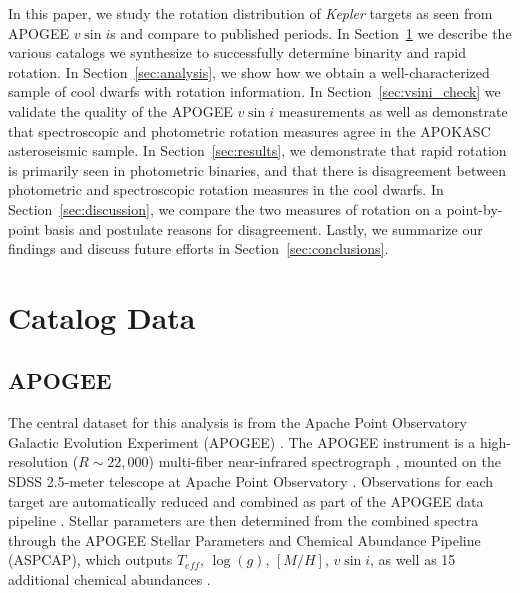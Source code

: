 \documentclass[manuscript]{aastex6}
\newcommand{\vsini}{\ensuremath{v \sin i}}
\newcommand{\Kepler}{\mbox{\textit{Kepler}}}
\newcommand{\Teff}{\ensuremath{T_{eff}}}
\newcommand{\logg}{\ensuremath{\log(g)}}
\begin{document}
In this paper, we study the rotation distribution of \Kepler{} targets as
seen from APOGEE \vsini{}s and compare to published periods. In 
Section~\ref{sec:data} we describe the various catalogs we synthesize to
successfully determine binarity and rapid rotation.
In Section~\ref{sec:analysis}, we show how we obtain a well-characterized
sample of cool dwarfs with rotation information. In
Section~\ref{sec:vsini_check} we validate the quality of the APOGEE \vsini{}
measurements as well as demonstrate that spectroscopic and photometric rotation
measures agree in the 
APOKASC asteroseismic sample. In Section~\ref{sec:results}, we demonstrate that
rapid rotation is primarily seen in photometric binaries, and that there is
disagreement between photometric and spectroscopic rotation measures in the
cool dwarfs. In Section~\ref{sec:discussion}, we compare the two measures of 
rotation on a point-by-point basis and postulate reasons for disagreement. 
Lastly, we summarize our findings and discuss future efforts in 
Section~\ref{sec:conclusions}.

\section{Catalog Data}
\label{sec:data}

\subsection{APOGEE}

The central dataset for this analysis is from the Apache Point Observatory 
Galactic Evolution Experiment (APOGEE) \citep{Blanton17,Majewski17}. The
APOGEE instrument is a high-resolution (\(R \sim 22,000\)) multi-fiber 
near-infrared spectrograph \citep{Wilson10}, mounted on the SDSS 2.5-meter 
telescope at Apache Point Observatory \citep{Gunn06}. Observations for each
target are automatically reduced and combined as part of the APOGEE data 
pipeline \citep{Nidever15}. Stellar parameters are then determined from the 
combined spectra through the APOGEE Stellar Parameters and Chemical Abundance 
Pipeline (ASPCAP), which outputs \Teff{}, \logg{}, \([M/H]\), \vsini{}, as 
well as 15 additional chemical abundances \citep{GarciaPerez16}.
\end{document}
